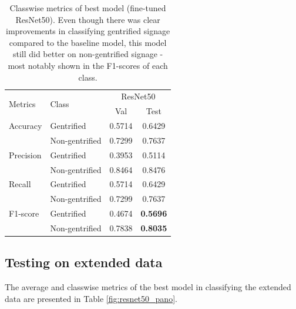 \begin{table}[h!]
\begin{tabular}{llcc}
\toprule
\multirow{2}{*}{Metrics}   & \multirow{2}{*}{Class} & \multicolumn{2}{c}{ResNet50} \\ \cline{3-4} 
                           &                        & Val           & Test         \\ \hline
Accuracy                   & Gentrified             & 0.5714        & 0.6429       \\
                           & Non-gentrified         & 0.7299        & 0.7637       \\
Precision                  & Gentrified             & 0.3953        & 0.5114       \\
                           & Non-gentrified         & 0.8464        & 0.8476       \\
Recall                     & Gentrified             & 0.5714        & 0.6429       \\
                           & Non-gentrified         & 0.7299        & 0.7637       \\
F1-score                   & Gentrified             & 0.4674        & \textbf{0.5696}       \\
                           & Non-gentrified         & 0.7838        & \textbf{0.8035}       \\
\bottomrule
\end{tabular}
\vspace{\baselineskip}
\caption{Classwise metrics of best model (fine-tuned ResNet50). Even though there was clear improvements in classifying gentrified signage compared to the baseline model, this model still did better on non-gentrified signage - most notably shown in the F1-scores of each class.}
\label{fig:resnet50_cls}
\vspace{-7mm}
\end{table}

\subsection{Testing on extended data}
The average and classwise metrics of the best model in classifying the extended data are presented in Table \ref{fig:resnet50_pano}.

